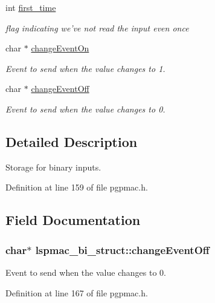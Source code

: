 \begin{DoxyCompactItemize}
int \hyperlink{structlspmac__bi__struct_a814978c33dc99e7911faa4ddb12bfd90}{first\-\_\-time}
\begin{DoxyCompactList}\small\item\em flag indicating we've not read the input even once \end{DoxyCompactList}\item 
char $\ast$ \hyperlink{structlspmac__bi__struct_ae7178007dfdf21be0e5b1fbaa36732af}{change\-Event\-On}
\begin{DoxyCompactList}\small\item\em Event to send when the value changes to 1. \end{DoxyCompactList}\item 
char $\ast$ \hyperlink{structlspmac__bi__struct_ae0859842f637694ace0e6d54c0e2af6a}{change\-Event\-Off}
\begin{DoxyCompactList}\small\item\em Event to send when the value changes to 0. \end{DoxyCompactList}\end{DoxyCompactItemize}


\subsection{Detailed Description}
Storage for binary inputs. 

Definition at line 159 of file pgpmac.\-h.



\subsection{Field Documentation}
\hypertarget{structlspmac__bi__struct_ae0859842f637694ace0e6d54c0e2af6a}{
\subsubsection[{change\-Event\-Off}]{\setlength{\rightskip}{0pt plus 5cm}char$\ast$ lspmac\-\_\-bi\-\_\-struct\-::change\-Event\-Off}}\label{structlspmac__bi__struct_ae0859842f637694ace0e6d54c0e2af6a}


Event to send when the value changes to 0. 



Definition at line 167 of file pgpmac.\-h.

